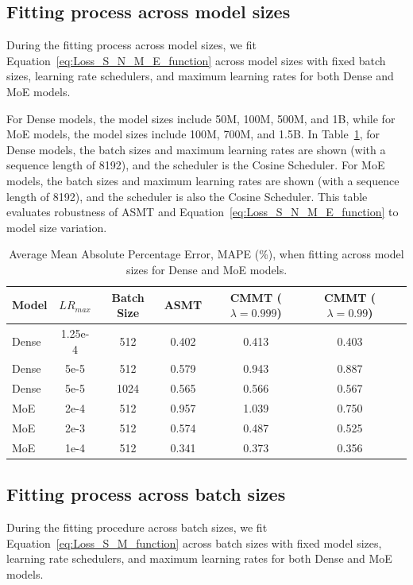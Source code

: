 \documentclass[letterpaper]{article} %
\begin{document}
\subsection{Fitting process across model sizes}
During the fitting process across model sizes, we fit Equation~\ref{eq:Loss_S_N_M_E_function} across model sizes with fixed batch sizes, learning rate schedulers, and maximum learning rates for both Dense and MoE models.

For Dense models, the model sizes include 50M, 100M, 500M, and 1B, while for MoE models, the model sizes include 100M, 700M, and 1.5B. In Table~\ref{tab:avg-mape}, for Dense models, the batch sizes and maximum learning rates are shown (with a sequence length of 8192), and the scheduler is the Cosine Scheduler. For MoE models, the batch sizes and maximum learning rates are shown (with a sequence length of 8192), and the scheduler is also the Cosine Scheduler. This table evaluates robustness of ASMT and Equation~\ref{eq:Loss_S_N_M_E_function} to model size variation.

\begin{table}[ht]
	\centering
	\setlength{\tabcolsep}{1.4pt}
	\renewcommand{\arraystretch}{1.2}
	\begin{tabular}{lcccccc}
		\toprule
		\textbf{Model} & \textbf{$LR_{max}$} & \textbf{Batch Size} & ASMT  & \makecell{CMMT\\($\lambda=0.999$)} & \makecell{CMMT\\($\lambda=0.99$)} \\
		\midrule
		Dense & 1.25e-4 & 512 & 0.402 & 0.413 & 0.403\\
		Dense & 5e-5 & 512 & 0.579 & 0.943 & 0.887\\
		Dense & 5e-5 & 1024 & 0.565 & 0.566 & 0.567 \\
		MoE   & 2e-4 & 512 & 0.957 & 1.039 & 0.750\\
		MoE   & 2e-3 & 512 & 0.574 & 0.487& 0.525  \\
		MoE   & 1e-4 & 512 & 0.341 & 0.373 & 0.356 \\
		\bottomrule
	\end{tabular}
	\caption{Average Mean Absolute Percentage Error, MAPE (\%), when fitting across model sizes for Dense and MoE models.}
	\label{tab:avg-mape}
\end{table}

\subsection{Fitting process across batch sizes} During the fitting procedure across batch sizes, we fit Equation~\ref{eq:Loss_S_M_function} across batch sizes with fixed model sizes, learning rate schedulers, and maximum learning rates for both Dense and MoE models. 
\end{document}
